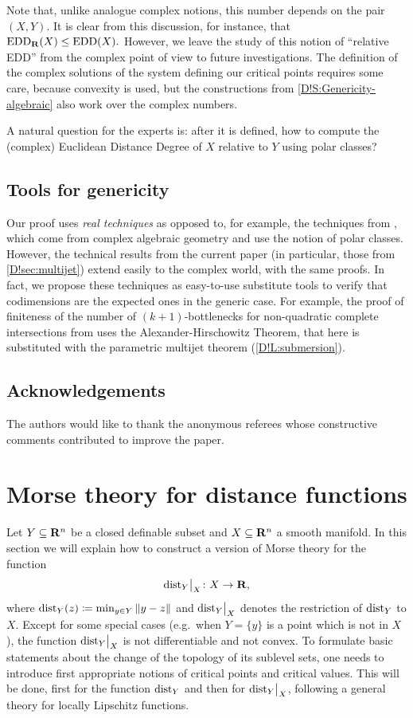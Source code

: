 Note that, unlike analogue complex notions, this number depends on the pair $(X, Y)$.
It is clear from this discussion, for instance, that $\mathrm{EDD}_{\mathbf{R}}(X)\leq \mathrm{EDD}(X).$
However, we leave the study of this notion of ``relative EDD'' from the complex point of view to future investigations. The definition of the complex solutions of the system defining our critical points requires some care, because convexity is used, but the constructions from \cref{D!S:Genericity-algebraic} also work over the complex numbers. 

A natural question for the experts is: after it is defined, how to compute the (complex) Euclidean Distance Degree of $X$ relative to $Y$ using polar classes?

\subsection{Tools for genericity}

Our proof uses \textit{real techniques} as opposed to, for example, the techniques from \cite{DREW2020}, which come from complex algebraic geometry and use the notion of polar classes. However, the technical results from the current paper (in particular, those from \cref{D!sec:multijet}) extend easily to the complex world, with the same proofs. In fact, we propose these techniques as easy-to-use substitute tools to verify that codimensions are the expected ones in the generic case. For example, the proof of finiteness of the number of $(k+1)$-bottlenecks for non-quadratic complete intersections from  \cite[Theorem 4.14]{DEEGH2023} uses the Alexander-Hirschowitz Theorem, that here is substituted with the parametric multijet theorem (\cref{D!L:submersion}).

\subsection*{Acknowledgements}
The authors would like to thank the anonymous referees whose constructive comments contributed to improve the paper.

\section{Morse theory for distance functions}
\label{D!S:Morse}

Let $Y\subseteq \mathbf{R}^n$ be a closed definable subset and $X\subseteq \mathbf{R}^n$ a smooth manifold. In this section we will explain how to construct a version of Morse theory for the function 
\[
  \mathord{\operatorname{dist}}_Y\big|_X \colon X \to \mathbf{R},
\]
where $\operatorname{dist}_Y(z) \coloneq \min_{y\in Y} \| y - z \|$ and $\mathord{\operatorname{dist}}_Y\big|_X$ denotes the restriction of $\operatorname{dist}_Y$ to $X$. 
Except for some special cases (e.g.\ when $Y=\{y\}$ is a point which is not in $X$), the function $\mathord{\operatorname{dist}}_Y\big|_X$ is not differentiable and not convex. To formulate basic statements about the change of the topology of its  sublevel sets, one needs to introduce first appropriate notions of critical points and critical values. 
This will be done, first for the function $\operatorname{dist}_Y$ and then for $\mathord{\operatorname{dist}}_Y\big|_X$, following a  general theory for locally Lipschitz functions. 

